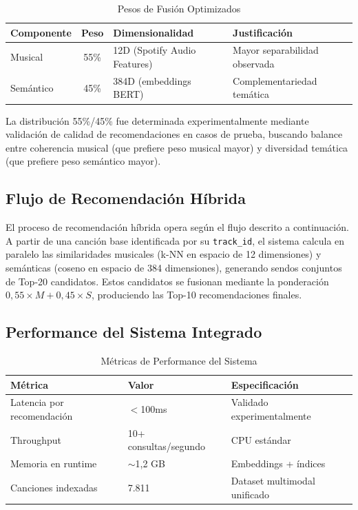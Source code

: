 \begin{table}[htbp]
\centering
\caption{Pesos de Fusión Optimizados}
\label{tab:pesos-fusion}
\begin{tabular}{lcll}
\toprule
\textbf{Componente} & \textbf{Peso} & \textbf{Dimensionalidad} & \textbf{Justificación} \\
\midrule
Musical & 55\% & 12D (Spotify Audio Features) & Mayor separabilidad observada \\
Semántico & 45\% & 384D (embeddings BERT) & Complementariedad temática \\
\bottomrule
\end{tabular}
\end{table}

La distribución 55\%/45\% fue determinada experimentalmente mediante validación de calidad de recomendaciones en casos de prueba, buscando balance entre coherencia musical (que prefiere peso musical mayor) y diversidad temática (que prefiere peso semántico mayor).

\subsection{Flujo de Recomendación Híbrida}
\label{subsec:flujo-recomendacion}

El proceso de recomendación híbrida opera según el flujo descrito a continuación. A partir de una canción base identificada por su \texttt{track\_id}, el sistema calcula en paralelo las similaridades musicales (k-NN en espacio de 12 dimensiones) y semánticas (coseno en espacio de 384 dimensiones), generando sendos conjuntos de Top-20 candidatos. Estos candidatos se fusionan mediante la ponderación $0{,}55 \times M + 0{,}45 \times S$, produciendo las Top-10 recomendaciones finales.

\subsection{Performance del Sistema Integrado}
\label{subsec:performance-sistema}

\begin{table}[htbp]
\centering
\caption{Métricas de Performance del Sistema}
\label{tab:performance-sistema}
\begin{tabular}{lll}
\toprule
\textbf{Métrica} & \textbf{Valor} & \textbf{Especificación} \\
\midrule
Latencia por recomendación & $<$100ms & Validado experimentalmente \\
Throughput & 10+ consultas/segundo & CPU estándar \\
Memoria en runtime & $\sim$1,2 GB & Embeddings + índices \\
Canciones indexadas & 7.811 & Dataset multimodal unificado \\
\bottomrule
\end{tabular}
\end{table}

